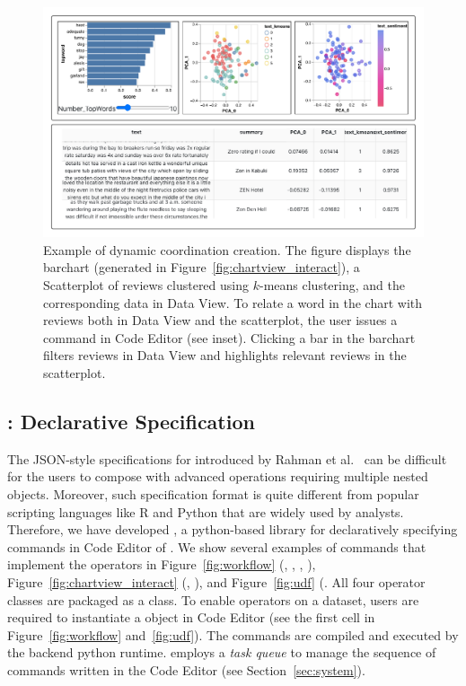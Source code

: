 \begin{figure}[!htb] 
  \centering
  \includegraphics[width=\linewidth]{figures/chart_view.pdf}
  \caption{\small {} Example of dynamic coordination creation. The figure displays the barchart (generated in Figure~\ref{fig:chartview_interact}), a Scatterplot of reviews clustered using $k$-means clustering, and the corresponding data in Data View. To relate a word in the chart with reviews both in Data View and the scatterplot, the user issues a \vital command in Code Editor (see inset). Clicking a bar in the barchart filters reviews in Data View and highlights relevant reviews in the scatterplot. \label{fig:chartview_coordinate_multi}} 
\end{figure}


\subsection{\vital: Declarative \vta Specification}
The JSON-style specifications for \vta introduced by Rahman et al.~\cite{rahman2020leam} can be difficult for the users to compose with advanced operations requiring multiple nested objects. Moreover, such specification format is quite different from popular scripting languages like R and Python that are widely used by analysts. Therefore, we have developed \vital, a python-based library for declaratively specifying \vta commands in Code Editor of \system. We show several examples of \vital commands that implement the \vta operators in Figure~\ref{fig:workflow} (, , , ), Figure~\ref{fig:chartview_interact} (, ), and Figure~\ref{fig:udf} (. All four \vta operator classes are packaged as a  class. To enable \vta operators on a dataset, users are required to instantiate a  object in Code Editor (see the first cell in Figure~\ref{fig:workflow} and~\ref{fig:udf}). The \vital commands are compiled and executed by the backend python runtime. \system employs a \emph{task queue} to manage the sequence of \vital commands written in the Code Editor (see Section~\ref{sec:system}). 
